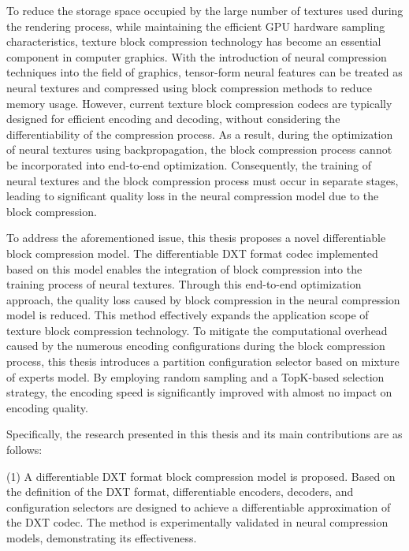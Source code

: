 \begin{abstract*}

  To reduce the storage space occupied by the large number of textures used during the rendering process, 
  while maintaining the efficient GPU hardware sampling characteristics, 
  texture block compression technology has become an essential component in computer graphics. 
  With the introduction of neural compression techniques into the field of graphics, tensor-form neural features can be treated as neural textures and compressed using block compression methods to reduce memory usage. However, current texture block compression codecs are typically designed for efficient encoding and decoding, without considering the differentiability of the compression process. As a result, during the optimization of neural textures using backpropagation, the block compression process cannot be incorporated into end-to-end optimization. Consequently, the training of neural textures and the block compression process must occur in separate stages, leading to significant quality loss in the neural compression model due to the block compression.

  To address the aforementioned issue, 
  this thesis proposes a novel differentiable block compression model. 
  The differentiable DXT format codec implemented based on this model enables the integration of block compression into the training process of neural textures.
  Through this end-to-end optimization approach, 
  the quality loss caused by block compression in the neural compression model is reduced. 
  This method effectively expands the application scope of texture block compression technology. 
  To mitigate the computational overhead caused by the numerous encoding configurations during the block compression process, 
  this thesis introduces a partition configuration selector based on mixture of experts model. 
  By employing random sampling and a TopK-based selection strategy, 
  the encoding speed is significantly improved with almost no impact on encoding quality.

  Specifically, the research presented in this thesis and its main contributions are as follows:

  (1) A differentiable DXT format block compression model is proposed. Based on the definition of the DXT format, differentiable encoders, decoders, and configuration selectors are designed to achieve a differentiable approximation of the DXT codec. The method is experimentally validated in neural compression models, demonstrating its effectiveness.
  

\end{abstract*}
